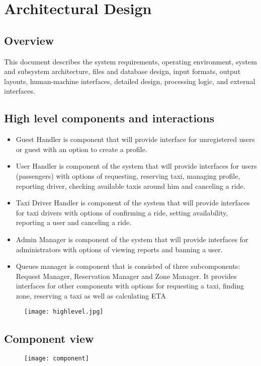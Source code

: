 \documentclass[12pt, oneside]{book}   	%
\begin{document}
\chapter{Architectural Design}
\section{Overview}
This document describes the system requirements, operating environment, system and subsystem architecture, files and database design, input formats, output layouts, human-machine interfaces, detailed design, processing logic, and external interfaces.
\section{High level components and interactions}
\begin{itemize}
\item Guest Handler is component that will provide interface for unregistered users or guest with an option to create a profile.
\item User Handler is component of the system that will provide interfaces for users (passengers) with options of requesting, reserving taxi, managing profile, reporting driver, checking available taxis around him and canceling a ride.
\item Taxi Driver Handler is component of the system that will provide interfaces for taxi drivers with options of confirming a ride, setting availability, reporting a user and canceling a ride.
\item Admin Manager is component of the system that will provide interfaces for administrators with options of viewing reports and banning a user.
\item Queues manager is component that is consisted of three subcomponents: Request Manager, Reservation Manager and Zone Manager. It provides interfaces for other components with options for requesting a taxi, finding zone, reserving a taxi as well as calculating ETA
\end{itemize}
\begin{figure}[h]
\center \texttt{[image: highlevel.jpg]}
\end{figure}
\clearpage
\section{Component view}
\begin{figure}[h]
\center \texttt{[image: component]}
\end{figure}
\clearpage
\end{document}

